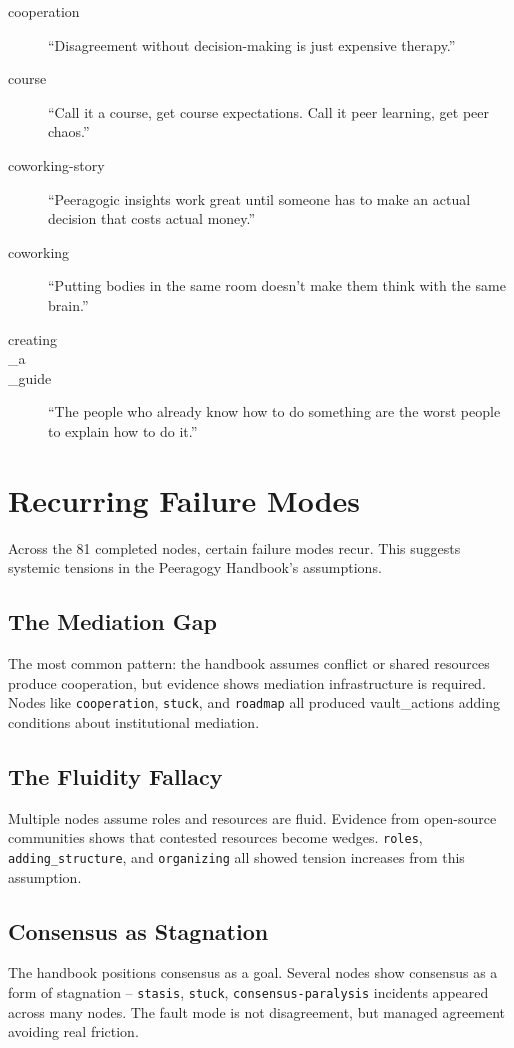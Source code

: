 \documentclass[11pt,a4paper]{article}
\begin{document}
\begin{description}
  \item[cooperation] ``Disagreement without decision-making is just expensive therapy.''
  \item[course] ``Call it a course, get course expectations. Call it peer learning, get peer chaos.''
  \item[coworking-story] ``Peeragogic insights work great until someone has to make an actual decision that costs actual money.''
  \item[coworking] ``Putting bodies in the same room doesn't make them think with the same brain.''
  \item[creating\\_a\\_guide] ``The people who already know how to do something are the worst people to explain how to do it.''
\end{description}

\section{Recurring Failure Modes}
Across the 81 completed nodes, certain failure modes recur. This suggests systemic tensions in the Peeragogy Handbook's assumptions.

\subsection{The Mediation Gap}
The most common pattern: the handbook assumes conflict or shared resources produce cooperation, but evidence shows mediation infrastructure is required. Nodes like \texttt{cooperation}, \texttt{stuck}, and \texttt{roadmap} all produced vault\_actions adding conditions about institutional mediation.

\subsection{The Fluidity Fallacy}
Multiple nodes assume roles and resources are fluid. Evidence from open-source communities shows that contested resources become wedges. \texttt{roles}, \texttt{adding\_structure}, and \texttt{organizing} all showed tension increases from this assumption.

\subsection{Consensus as Stagnation}
The handbook positions consensus as a goal. Several nodes show consensus as a form of stagnation -- \texttt{stasis}, \texttt{stuck}, \texttt{consensus-paralysis} incidents appeared across many nodes. The fault mode is not disagreement, but managed agreement avoiding real friction.
\end{document}
